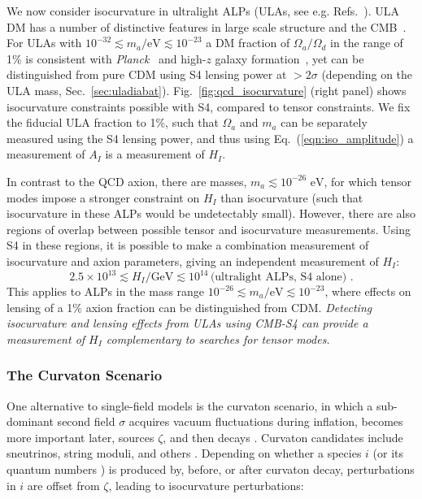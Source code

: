 We now consider isocurvature in ultralight ALPs (ULAs, see e.g. Refs.~\cite{Marsh:2013taa,Marsh:2014qoa}). ULA DM has a number of distinctive features in large scale structure and the CMB~\cite{Hlozek:2015axa,Marsh:2013ywa}. For ULAs with $10^{-32}\lesssim m_a/\text{eV}\lesssim 10^{-23}$ a DM fraction of $\Omega_a/\Omega_d$ in the range of 1\% is consistent with \emph{Planck}~\cite{Hlozek:2015axa} and high-$z$ galaxy formation~\cite{Bozek:2014uqa,Schive:2015kza}, yet can be distinguished from pure CDM using S4 lensing power at $>2\sigma$ (depending on the ULA mass, Sec.~\ref{sec:uladiabat}). Fig.~\ref{fig:qcd_isocurvature} (right panel) shows isocurvature constraints possible with S4, compared to tensor constraints. We fix the fiducial ULA fraction to 1\%, such that $\Omega_a$ and $m_a$ can be separately measured using the S4 lensing power, and thus using Eq.~(\ref{eqn:iso_amplitude}) a measurement of $A_I$ is a measurement of $H_I$. 

In contrast to the QCD axion, there are masses, $m_a\lesssim 10^{-26}\text{ eV}$, for which tensor modes impose a stronger constraint on $H_I$ than isocurvature (such that isocurvature in these ALPs would be undetectably small). However, there are also regions of overlap between possible tensor and isocurvature measurements. Using S4 in these regions, it is possible to make a combination measurement of isocurvature and axion parameters, giving an independent measurement of $H_I$:
\begin{equation} 2.5\times 10^{13}\lesssim H_I/\text{GeV}\lesssim 10^{14}\,
\text{(ultralight ALPs, S4 alone)}\,\,.
\end{equation}
This applies to ALPs in the mass range $10^{-26}\lesssim m_a/\text{eV}\lesssim 10^{-23}$, where effects on lensing of a 1\% axion fraction can be distinguished from CDM. \emph{Detecting isocurvature and lensing effects from ULAs using CMB-S4 can provide a measurement of $H_I$ complementary to searches for tensor modes.}%

\subsubsection{The Curvaton Scenario}
One alternative to single-field models is the curvaton scenario, in which a sub-dominant second field $\sigma$ acquires vacuum fluctuations during inflation, becomes more important later, sources $\zeta$, and then decays \cite{Mollerach:1989hu,Mukhanov:1990me,Moroi:2001ct,Lyth:2001nq,Lyth:2002my}. Curvaton candidates include sneutrinos, string moduli, and others \cite{Postma:2002et,Kasuya:2003va,Ikegami:2004ve,Mazumdar:2004qv,Allahverdi:2006dr,Papantonopoulos:2006xi,Mazumdar:2010sa,Mazumdar:2011xe}. Depending on whether a species $i$ (or its quantum numbers ) is produced by, before, or after curvaton decay, perturbations in $i$ are offset from $\zeta$, leading to isocurvature perturbations: \cite{Lyth:2001nq,Lyth:2002my,Gordon:2002gv}

